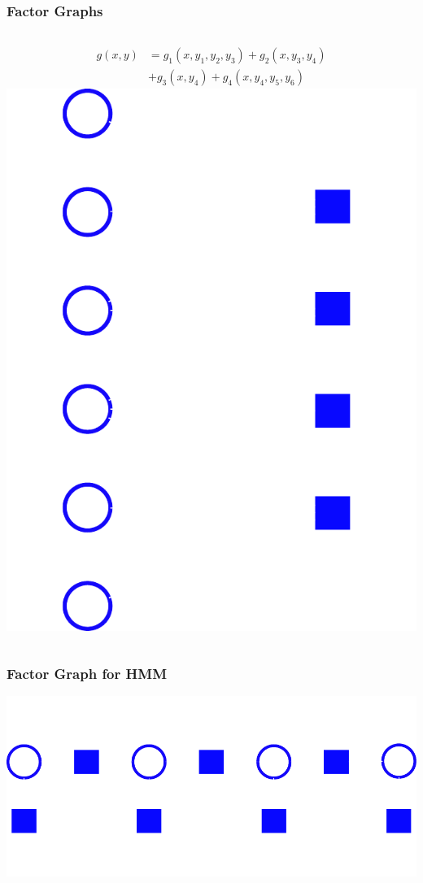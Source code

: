 \documentclass{beamer}
\begin{document}
    \begin{frame}
        \frametitle{Factor Graphs}
        \begin{columns}[c]
            \begin{align*}
            g(x, y) &= g_1(x, y_1, y_2, y_3) + g_2(x, y_3, y_4)\\
                    &+ g_3(x, y_4) + g_4(x, y_4, y_5, y_6)
            \end{align*}
                \includegraphics[width=\textwidth]{images/factor_graph}
        \end{columns}
    \end{frame}

    \begin{frame}
        \frametitle{Factor Graph for HMM}
        \begin{center}
            \includegraphics[width=.8\textwidth]{images/hmm}
        \end{center}
    \end{frame}
\end{document}
